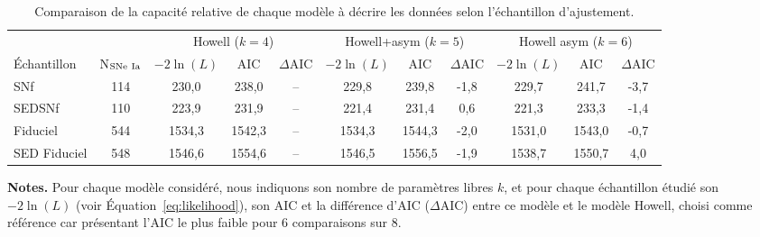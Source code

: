 \documentclass[../main/main.tex]{subfiles}
\begin{document}
\begin{table}[h]
    \centerfloat
        \caption[Comparaison de la capacité relative de chaque modèle à décrire
        les données selon l'échantillon d'ajustement]{Comparaison de la
            capacité relative de chaque modèle à décrire les données selon
        l'échantillon d'ajustement.}
        \label{tab:modelcomp}
    \begin{threeparttable}
        \begin{tabular}{lcccccccccc}
            \toprule &
            & \multicolumn{3}{c}{Howell ($k=4$)}
            & \multicolumn{3}{c}{Howell+asym ($k=5$)}
            & \multicolumn{3}{c}{Howell asym ($k=6$)} \\
            \cmidrule(lr){3-5}\cmidrule(lr){6-8}\cmidrule(lr){9-11}
            Échantillon & N$_{\rm SNe~Ia}$ &
            $-2\ln(L)$ & AIC & $\Delta$AIC &
            $-2\ln(L)$ & AIC & $\Delta$AIC &
            $-2\ln(L)$ & AIC & $\Delta$AIC\\[0.2em]
            \midrule
            SNf & 114 &
            230,0 & 238,0 & -- &
            229,8 & 239,8 & -1,8 &
            229,7 & 241,7 & -3,7 \\
            SEDSNf & 110 &
            223,9 & 231,9 & -- &
            221,4 & 231,4 & 0,6 &
            221,3 & 233,3 & -1,4 \\
            Fiduciel & 544 &
            1534,3 & 1542,3 & -- &
            1534,3 & 1544,3 & -2,0 &
            1531,0 & 1543,0 & -0,7 \\
            SED Fiduciel & 548 &
            1546,6 & 1554,6 & -- &
            1546,5 & 1556,5 & -1,9 &
            1538,7 & 1550,7 & 4,0 \\
            \bottomrule
    \end{tabular}
        \begin{tablenotes}[flushleft]
            \item\small \textbf{\hspace{-3.2pt}Notes.} Pour chaque modèle
                considéré, nous indiquons son nombre
                de paramètres libres $k$, et pour chaque échantillon étudié son
                $-2\ln(L)$ (voir Équation~\ref{eq:likelihood}), son AIC et la
                différence d'AIC ($\Delta$AIC) entre ce modèle et le modèle
                Howell, choisi comme référence car présentant l'AIC le plus
                faible pour 6 comparaisons sur 8.
        \end{tablenotes}
    \end{threeparttable}
\end{table}
\end{document}

